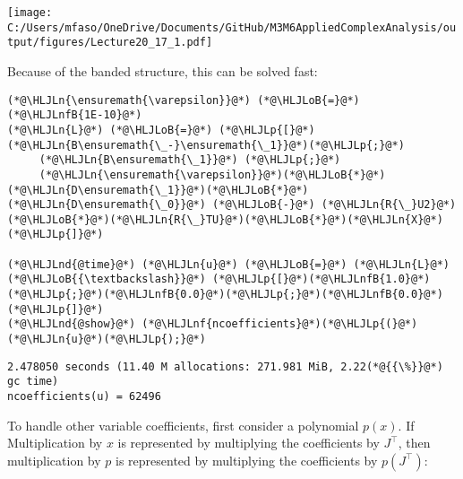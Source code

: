 \documentclass[12pt,a4paper]{article}
\newcommand{\HLJLn}[1]{#1}
\newcommand{\HLJLnd}[1]{\textcolor[RGB]{214,102,97}{#1}}
\newcommand{\HLJLnf}[1]{\textcolor[RGB]{66,102,213}{#1}}
\newcommand{\HLJLnfB}[1]{\textcolor[RGB]{59,151,46}{#1}}
\newcommand{\HLJLoB}[1]{\textcolor[RGB]{102,102,102}{\textbf{#1}}}
\newcommand{\HLJLp}[1]{#1}
\begin{document}
\texttt{[image: C:/Users/mfaso/OneDrive/Documents/GitHub/M3M6AppliedComplexAnalysis/output/figures/Lecture20\_17\_1.pdf]}

Because of the banded structure, this can be solved fast:


\begin{lstlisting}
(*@\HLJLn{\ensuremath{\varepsilon}}@*) (*@\HLJLoB{=}@*) (*@\HLJLnfB{1E-10}@*)
(*@\HLJLn{L}@*) (*@\HLJLoB{=}@*) (*@\HLJLp{[}@*)(*@\HLJLn{B\ensuremath{\_-}\ensuremath{\_1}}@*)(*@\HLJLp{;}@*)
     (*@\HLJLn{B\ensuremath{\_1}}@*) (*@\HLJLp{;}@*)
     (*@\HLJLn{\ensuremath{\varepsilon}}@*)(*@\HLJLoB{*}@*)(*@\HLJLn{D\ensuremath{\_1}}@*)(*@\HLJLoB{*}@*)(*@\HLJLn{D\ensuremath{\_0}}@*) (*@\HLJLoB{-}@*) (*@\HLJLn{R{\_}U2}@*)(*@\HLJLoB{*}@*)(*@\HLJLn{R{\_}TU}@*)(*@\HLJLoB{*}@*)(*@\HLJLn{X}@*)(*@\HLJLp{]}@*)

(*@\HLJLnd{@time}@*) (*@\HLJLn{u}@*) (*@\HLJLoB{=}@*) (*@\HLJLn{L}@*) (*@\HLJLoB{{\textbackslash}}@*) (*@\HLJLp{[}@*)(*@\HLJLnfB{1.0}@*)(*@\HLJLp{;}@*)(*@\HLJLnfB{0.0}@*)(*@\HLJLp{;}@*)(*@\HLJLnfB{0.0}@*)(*@\HLJLp{]}@*)
(*@\HLJLnd{@show}@*) (*@\HLJLnf{ncoefficients}@*)(*@\HLJLp{(}@*)(*@\HLJLn{u}@*)(*@\HLJLp{);}@*)
\end{lstlisting}

\begin{lstlisting}
2.478050 seconds (11.40 M allocations: 271.981 MiB, 2.22(*@{{\%}}@*) gc time)
ncoefficients(u) = 62496
\end{lstlisting}


To handle other variable coefficients, first consider a polynomial $p(x)$. If Multiplication by $x$ is represented by multiplying the coefficients by $J^\top$, then multiplication by $p$ is represented by multiplying the coefficients by $p(J^\top)$:
\end{document}
